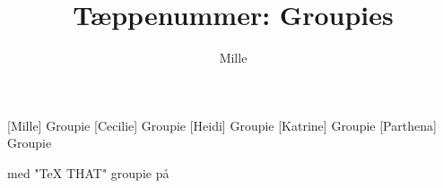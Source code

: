 \documentclass[danish]{article}
\title{Tæppenummer: Groupies}
\author{Mille}
\begin{document}
\maketitle

\begin{roles}
  [Mille] Groupie
  [Cecilie] Groupie
  [Heidi] Groupie
  [Katrine] Groupie
  [Parthena] Groupie
\end{roles}

\begin{props}
   med "TeX THAT" groupie på
\end{props}

\begin{sketch}

\end{sketch}
\end{document}
